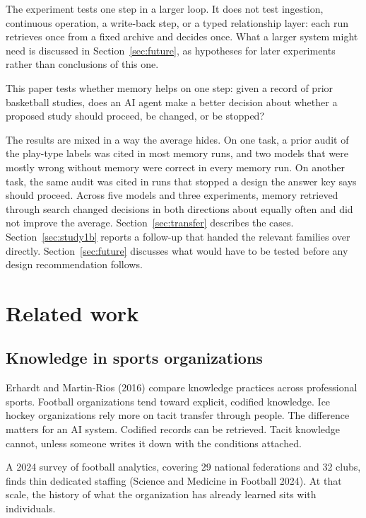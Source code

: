 \documentclass[11pt]{article}
\begin{document}
The experiment tests one step in a larger loop. It does not test ingestion, continuous operation, a write-back step, or a typed relationship layer: each run retrieves once from a fixed archive and decides once. What a larger system might need is discussed in Section~\ref{sec:future}, as hypotheses for later experiments rather than conclusions of this one.

This paper tests whether memory helps on one step: given a record of prior basketball studies, does an AI agent make a better decision about whether a proposed study should proceed, be changed, or be stopped?

The results are mixed in a way the average hides. On one task, a prior audit of the play-type labels was cited in most memory runs, and two models that were mostly wrong without memory were correct in every memory run. On another task, the same audit was cited in runs that stopped a design the answer key says should proceed. Across five models and three experiments, memory retrieved through search changed decisions in both directions about equally often and did not improve the average. Section~\ref{sec:transfer} describes the cases. Section~\ref{sec:study1b} reports a follow-up that handed the relevant families over directly. Section~\ref{sec:future} discusses what would have to be tested before any design recommendation follows.

\section{Related work}
\label{sec:related}

\subsection{Knowledge in sports organizations}

Erhardt and Martin-Rios (2016) compare knowledge practices across professional sports. Football organizations tend toward explicit, codified knowledge. Ice hockey organizations rely more on tacit transfer through people. The difference matters for an AI system. Codified records can be retrieved. Tacit knowledge cannot, unless someone writes it down with the conditions attached.

A 2024 survey of football analytics, covering 29 national federations and 32 clubs, finds thin dedicated staffing (Science and Medicine in Football 2024). At that scale, the history of what the organization has already learned sits with individuals.
\end{document}
